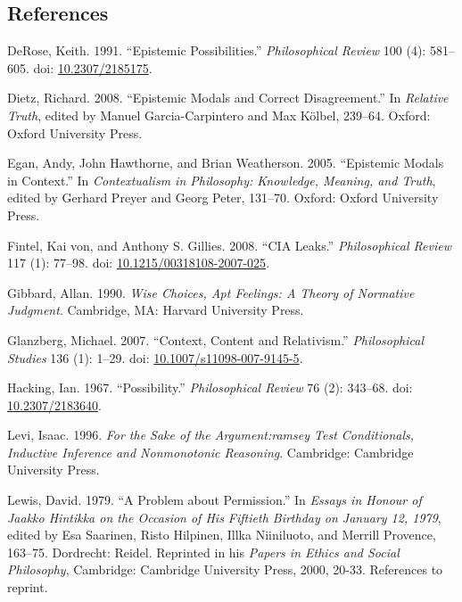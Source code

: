 \documentclass[
  10pt,
  letterpaper,
  DIV=11,
  numbers=noendperiod,
  twoside]{scrartcl}
\newlength{\cslhangindent}
\newenvironment{CSLReferences}[2] %
 {\begin{list}{}{%
  \setlength{\itemindent}{0pt}
  \setlength{\leftmargin}{0pt}
  \setlength{\parsep}{0pt}
  \ifodd #1
   \setlength{\leftmargin}{\cslhangindent}
   \setlength{\itemindent}{-1\cslhangindent}
  \fi
  \setlength{\itemsep}{#2\baselineskip}}}
 {\end{list}}
\begin{document}
\subsection*{References}\label{references}

\label{refs}
\begin{CSLReferences}{1}{0}
DeRose, Keith. 1991. {``Epistemic Possibilities.''} \emph{Philosophical
Review} 100 (4): 581--605. doi:
\href{https://doi.org/10.2307/2185175}{10.2307/2185175}.

Dietz, Richard. 2008. {``Epistemic Modals and Correct Disagreement.''}
In \emph{Relative Truth}, edited by Manuel Garcia-Carpintero and Max
Kölbel, 239--64. Oxford: Oxford University Press.

Egan, Andy, John Hawthorne, and Brian Weatherson. 2005. {``{Epistemic
Modals in Context}.''} In \emph{Contextualism in Philosophy: Knowledge,
Meaning, and Truth}, edited by Gerhard Preyer and Georg Peter, 131--70.
Oxford: Oxford University Press.

Fintel, Kai von, and Anthony S. Gillies. 2008. {``CIA Leaks.''}
\emph{Philosophical Review} 117 (1): 77--98. doi:
\href{https://doi.org/10.1215/00318108-2007-025}{10.1215/00318108-2007-025}.

Gibbard, Allan. 1990. \emph{Wise Choices, Apt Feelings: A Theory of
Normative Judgment}. Cambridge, MA: Harvard University Press.

Glanzberg, Michael. 2007. {``Context, Content and Relativism.''}
\emph{Philosophical Studies} 136 (1): 1--29. doi:
\href{https://doi.org/10.1007/s11098-007-9145-5}{10.1007/s11098-007-9145-5}.

Hacking, Ian. 1967. {``Possibility.''} \emph{Philosophical Review} 76
(2): 343--68. doi:
\href{https://doi.org/10.2307/2183640}{10.2307/2183640}.

Levi, Isaac. 1996. \emph{For the Sake of the Argument:ramsey Test
Conditionals, Inductive Inference and Nonmonotonic Reasoning}.
Cambridge: Cambridge University Press.

Lewis, David. 1979. {``A Problem about Permission.''} In \emph{Essays in
Honour of {J}aakko Hintikka on the Occasion of His Fiftieth Birthday on
{J}anuary 12, 1979}, edited by Esa Saarinen, Risto Hilpinen, Illka
Niiniluoto, and Merrill Provence, 163--75. Dordrecht: Reidel. Reprinted
in his \emph{Papers in Ethics and Social Philosophy}, Cambridge:
Cambridge University Press, 2000, 20-33. References to reprint.


\end{CSLReferences}
\end{document}
